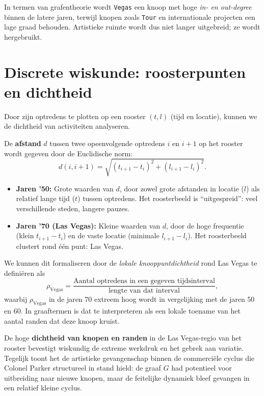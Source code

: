 \documentclass{book}
\begin{document}
	In termen van grafentheorie wordt \texttt{Vegas} een knoop met hoge \emph{in- en out-degree} binnen de latere jaren, terwijl knopen zoals \texttt{Tour} en internationale projecten een lage graad behouden. Artistieke ruimte wordt dus niet langer uitgebreid; ze wordt hergebruikt.
	
	\section{Discrete wiskunde: roosterpunten en dichtheid}
	
	Door zijn optredens te plotten op een rooster $(t, l)$ (tijd en locatie), kunnen we de dichtheid van activiteiten analyseren.
	
	De \textbf{afstand} $d$ tussen twee opeenvolgende optredens $i$ en $i+1$ op het rooster wordt gegeven door de Euclidische norm:
	\[
	d(i, i+1) = \sqrt{(t_{i+1} - t_i)^2 + (l_{i+1} - l_i)^2}.
	\]
	
	\begin{itemize}
		\item \textbf{Jaren '50:} Grote waarden van $d$, door zowel grote afstanden in locatie ($l$) als relatief lange tijd ($t$) tussen optredens. Het roosterbeeld is ``uitgespreid'': veel verschillende steden, langere pauzes.
		\item \textbf{Jaren '70 (Las Vegas):} Kleine waarden van $d$, door de hoge frequentie (klein $t_{i+1} - t_i$) en de vaste locatie (minimale $l_{i+1} - l_i$). Het roosterbeeld clustert rond \'e\'en punt: Las Vegas.
	\end{itemize}
	
	We kunnen dit formaliseren door de \emph{lokale knooppuntdichtheid} rond Las Vegas te defini\"eren als
	\[
	\rho_{\text{Vegas}} = \frac{\text{Aantal optredens in een gegeven tijdsinterval}}{\text{lengte van dat interval}},
	\]
	waarbij $\rho_{\text{Vegas}}$ in de jaren 70 extreem hoog wordt in vergelijking met de jaren 50 en 60. In graaftermen is dat te interpreteren als een lokale toename van het aantal randen dat deze knoop kruist.
	
	De hoge \textbf{dichtheid van knopen en randen} in de Las Vegas-regio van het rooster bevestigt wiskundig de extreme werkdruk en het gebrek aan variatie. Tegelijk toont het de artistieke gevangenschap binnen de commerci\"ele cyclus die Colonel Parker structureel in stand hield: de graaf $G$ had potentieel voor uitbreiding naar nieuwe knopen, maar de feitelijke dynamiek bleef gevangen in een relatief kleine cyclus.
	
\end{document}
